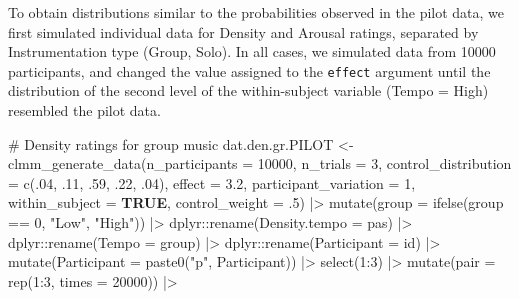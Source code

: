 \documentclass[
  bookmarksnumbered]{article}
\newenvironment{Shaded}{\begin{snugshade}}{\end{snugshade}}
\newcommand{\AttributeTok}[1]{\textcolor[rgb]{0.80,0.80,0.80}{#1}}
\newcommand{\CommentTok}[1]{\textcolor[rgb]{0.50,0.62,0.50}{#1}}
\newcommand{\ConstantTok}[1]{\textcolor[rgb]{0.86,0.64,0.64}{\textbf{#1}}}
\newcommand{\DecValTok}[1]{\textcolor[rgb]{0.86,0.86,0.80}{#1}}
\newcommand{\FloatTok}[1]{\textcolor[rgb]{0.75,0.75,0.82}{#1}}
\newcommand{\FunctionTok}[1]{\textcolor[rgb]{0.94,0.94,0.56}{#1}}
\newcommand{\NormalTok}[1]{\textcolor[rgb]{0.80,0.80,0.80}{#1}}
\newcommand{\OtherTok}[1]{\textcolor[rgb]{0.94,0.94,0.56}{#1}}
\newcommand{\SpecialCharTok}[1]{\textcolor[rgb]{0.86,0.64,0.64}{#1}}
\newcommand{\StringTok}[1]{\textcolor[rgb]{0.80,0.58,0.58}{#1}}
\begin{document}
To obtain distributions similar to the probabilities observed in the pilot data, we first simulated individual data for Density and Arousal ratings, separated by Instrumentation type (Group, Solo). In all cases, we simulated data from 10000 participants, and changed the value assigned to the \texttt{effect} argument until the distribution of the second level of the within-subject variable (Tempo = High) resembled the pilot data.

\begin{Shaded}
\begin{Highlighting}[]
\CommentTok{\# Density ratings for group music}
\NormalTok{dat.den.gr.PILOT }\OtherTok{\textless{}{-}} \FunctionTok{clmm\_generate\_data}\NormalTok{(}\AttributeTok{n\_participants =} \DecValTok{10000}\NormalTok{,}
                           \AttributeTok{n\_trials =} \DecValTok{3}\NormalTok{,}
                           \AttributeTok{control\_distribution =} \FunctionTok{c}\NormalTok{(.}\DecValTok{04}\NormalTok{, .}\DecValTok{11}\NormalTok{, .}\DecValTok{59}\NormalTok{, .}\DecValTok{22}\NormalTok{, .}\DecValTok{04}\NormalTok{),}
                           \AttributeTok{effect =} \FloatTok{3.2}\NormalTok{,}
                           \AttributeTok{participant\_variation =} \DecValTok{1}\NormalTok{,}
                           \AttributeTok{within\_subject =} \ConstantTok{TRUE}\NormalTok{,}
                           \AttributeTok{control\_weight =}\NormalTok{ .}\DecValTok{5}\NormalTok{) }\SpecialCharTok{|\textgreater{}}
  \FunctionTok{mutate}\NormalTok{(}\AttributeTok{group =} \FunctionTok{ifelse}\NormalTok{(group }\SpecialCharTok{==} \DecValTok{0}\NormalTok{, }\StringTok{"Low"}\NormalTok{, }\StringTok{"High"}\NormalTok{)) }\SpecialCharTok{|\textgreater{}}
\NormalTok{  dplyr}\SpecialCharTok{::}\FunctionTok{rename}\NormalTok{(}\AttributeTok{Density.tempo =}\NormalTok{ pas) }\SpecialCharTok{|\textgreater{}}
\NormalTok{  dplyr}\SpecialCharTok{::}\FunctionTok{rename}\NormalTok{(}\AttributeTok{Tempo =}\NormalTok{ group) }\SpecialCharTok{|\textgreater{}}
\NormalTok{  dplyr}\SpecialCharTok{::}\FunctionTok{rename}\NormalTok{(}\AttributeTok{Participant =}\NormalTok{ id) }\SpecialCharTok{|\textgreater{}}
  \FunctionTok{mutate}\NormalTok{(}\AttributeTok{Participant =} \FunctionTok{paste0}\NormalTok{(}\StringTok{"p"}\NormalTok{, Participant)) }\SpecialCharTok{|\textgreater{}}
  \FunctionTok{select}\NormalTok{(}\DecValTok{1}\SpecialCharTok{:}\DecValTok{3}\NormalTok{) }\SpecialCharTok{|\textgreater{}}
  \FunctionTok{mutate}\NormalTok{(}\AttributeTok{pair =} \FunctionTok{rep}\NormalTok{(}\DecValTok{1}\SpecialCharTok{:}\DecValTok{3}\NormalTok{, }\AttributeTok{times =} \DecValTok{20000}\NormalTok{)) }\SpecialCharTok{|\textgreater{}}

\end{Highlighting}
\end{Shaded}
\end{document}
